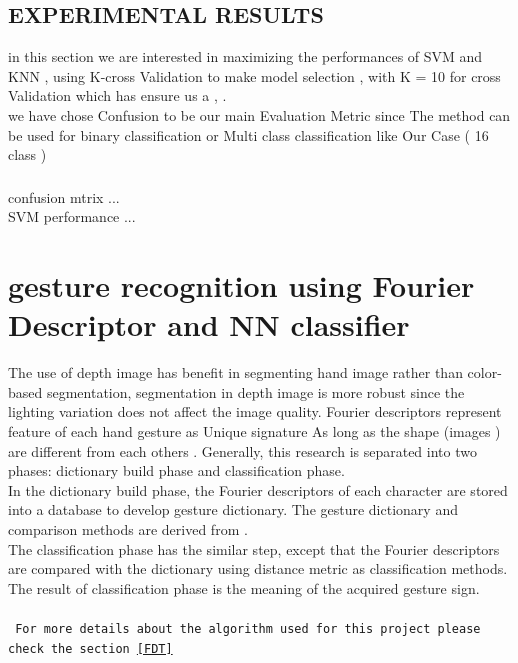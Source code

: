 \subsection{EXPERIMENTAL RESULTS }\label{resultssvm}
in this section we are interested in maximizing the performances of SVM and KNN , using K-cross Validation to make model selection , with  K = 10 for cross Validation which has ensure us a   ,  . \\
we have chose Confusion to be our main Evaluation Metric since The method can be used for binary classification or Multi class classification like Our Case ( 16 class ) 

\subsubsection{ } 

confusion mtrix ...\\
SVM performance ...

\newpage





\section{gesture recognition using Fourier Descriptor and NN  classifier }

 The use of depth image has benefit
in segmenting hand image rather than color-based
segmentation, segmentation in depth image is more robust
since the lighting variation does not affect the image quality.
 Fourier descriptors represent feature of each hand gesture as Unique signature As long as the shape (images ) are different from each others .
Generally, this research is separated into two phases:
dictionary build phase and classification phase. \\In the
dictionary build phase, the Fourier descriptors of each
character are stored into a database to develop gesture
dictionary. The gesture dictionary and comparison methods are
derived from \cite{clif}.\\ The classification phase has the similar
step, except that the Fourier descriptors are compared with the
dictionary using distance metric as classification methods.
The result of classification phase is the meaning of the
acquired gesture sign.\\\\
\texttt{
For more details about the algorithm used for this project please check the section \ref{FDT}
}

